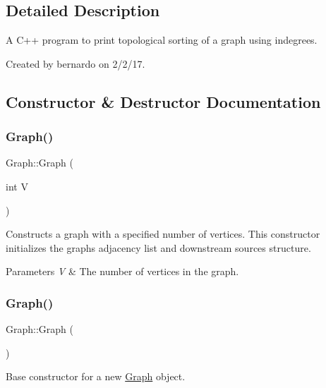 \subsection{Detailed Description}
A C++ program to print topological sorting of a graph using indegrees. 

Created by bernardo on 2/2/17. 

\subsection{Constructor \& Destructor Documentation}
\mbox{\label{classGraph_af3ff6b295df8bf3bee0bafd7c7d56915}} 
\subsubsection{\texorpdfstring{Graph()}{Graph()}\hspace{0.1cm}{\footnotesize\ttfamily [1/2]}}
{\footnotesize\ttfamily Graph\+::\+Graph (\begin{DoxyParamCaption}\item[{int}]{V }\end{DoxyParamCaption})}



Constructs a graph with a specified number of vertices. This constructor initializes the graph\textquotesingle{}s adjacency list and downstream sources structure. 


\begin{DoxyParams}{Parameters}
{\em V} & The number of vertices in the graph. \\
\hline
\end{DoxyParams}
\mbox{\label{classGraph_ae4c72b8ac4d693c49800a4c7e273654f}} 
\subsubsection{\texorpdfstring{Graph()}{Graph()}\hspace{0.1cm}{\footnotesize\ttfamily [2/2]}}
{\footnotesize\ttfamily Graph\+::\+Graph (\begin{DoxyParamCaption}{ }\end{DoxyParamCaption})}



Base constructor for a new \mbox{\hyperlink{classGraph}{Graph}} object. 

